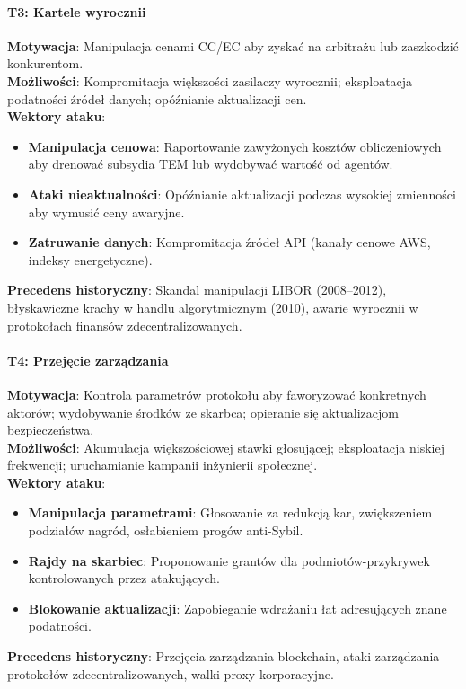 \documentclass[11pt]{article}
\begin{document}
\paragraph{T3: Kartele wyrocznii}
\textbf{Motywacja}: Manipulacja cenami CC/EC aby zyskać na arbitrażu lub zaszkodzić konkurentom.\\
\textbf{Możliwości}: Kompromitacja większości zasilaczy wyrocznii; eksploatacja podatności źródeł danych; opóźnianie aktualizacji cen.\\
\textbf{Wektory ataku}:
\begin{itemize}[noitemsep]
  \item \textbf{Manipulacja cenowa}: Raportowanie zawyżonych kosztów obliczeniowych aby drenować subsydia TEM lub wydobywać wartość od agentów.
  \item \textbf{Ataki nieaktualności}: Opóźnianie aktualizacji podczas wysokiej zmienności aby wymusić ceny awaryjne.
  \item \textbf{Zatruwanie danych}: Kompromitacja źródeł API (kanały cenowe AWS, indeksy energetyczne).
\end{itemize}
\textbf{Precedens historyczny}: Skandal manipulacji LIBOR (2008--2012), błyskawiczne krachy w handlu algorytmicznym (2010), awarie wyrocznii w protokołach finansów zdecentralizowanych.

\paragraph{T4: Przejęcie zarządzania}
\textbf{Motywacja}: Kontrola parametrów protokołu aby faworyzować konkretnych aktorów; wydobywanie środków ze skarbca; opieranie się aktualizacjom bezpieczeństwa.\\
\textbf{Możliwości}: Akumulacja większościowej stawki głosującej; eksploatacja niskiej frekwencji; uruchamianie kampanii inżynierii społecznej.\\
\textbf{Wektory ataku}:
\begin{itemize}[noitemsep]
  \item \textbf{Manipulacja parametrami}: Głosowanie za redukcją kar, zwiększeniem podziałów nagród, osłabieniem progów anti-Sybil.
  \item \textbf{Rajdy na skarbiec}: Proponowanie grantów dla podmiotów-przykrywek kontrolowanych przez atakujących.
  \item \textbf{Blokowanie aktualizacji}: Zapobieganie wdrażaniu łat adresujących znane podatności.
\end{itemize}
\textbf{Precedens historyczny}: Przejęcia zarządzania blockchain, ataki zarządzania protokołów zdecentralizowanych, walki proxy korporacyjne.
\end{document}
